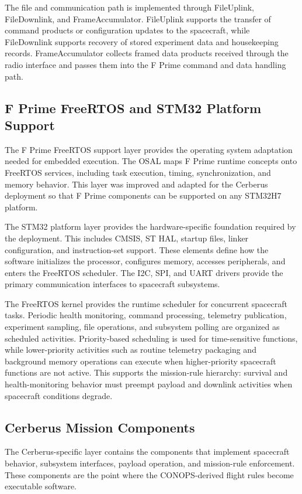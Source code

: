 \documentclass[10pt,letterpaper,twoside,fleqn]{article}
\newcommand{\Indent}{\hspace*{4\fontdimen2\font}}
\begin{document}
The file and communication path is implemented through FileUplink, FileDownlink, and FrameAccumulator. FileUplink supports the transfer of command products or configuration updates to the spacecraft, while FileDownlink supports recovery of stored experiment data and housekeeping records. FrameAccumulator collects framed data products received through the radio interface and passes them into the F Prime command and data handling path. 

\subsection {F Prime FreeRTOS and STM32 Platform Support}

\Indent The F Prime FreeRTOS support layer provides the operating system adaptation needed for embedded execution. The OSAL maps F Prime runtime concepts onto FreeRTOS services, including task execution, timing, synchronization, and memory behavior. This layer was improved and adapted for the Cerberus deployment so that F Prime components can be supported on any STM32H7 platform.

The STM32 platform layer provides the hardware-specific foundation required by the deployment. This includes CMSIS, ST HAL, startup files, linker configuration, and instruction-set support. These elements define how the software initializes the processor, configures memory, accesses peripherals, and enters the FreeRTOS scheduler. The I2C, SPI, and UART drivers provide the primary communication interfaces to spacecraft subsystems.

The FreeRTOS kernel provides the runtime scheduler for concurrent spacecraft tasks. Periodic health monitoring, command processing, telemetry publication, experiment sampling, file operations, and subsystem polling are organized as scheduled activities. Priority-based scheduling is used for time-sensitive functions, while lower-priority activities such as routine telemetry packaging and background memory operations can execute when higher-priority spacecraft functions are not active. This supports the mission-rule hierarchy: survival and health-monitoring behavior must preempt payload and downlink activities when spacecraft conditions degrade.

\subsection{Cerberus Mission Components}

\Indent The Cerberus-specific layer contains the components that implement spacecraft behavior, subsystem interfaces, payload operation, and mission-rule enforcement. These components are the point where the CONOPS-derived flight rules become executable software.
\end{document}
